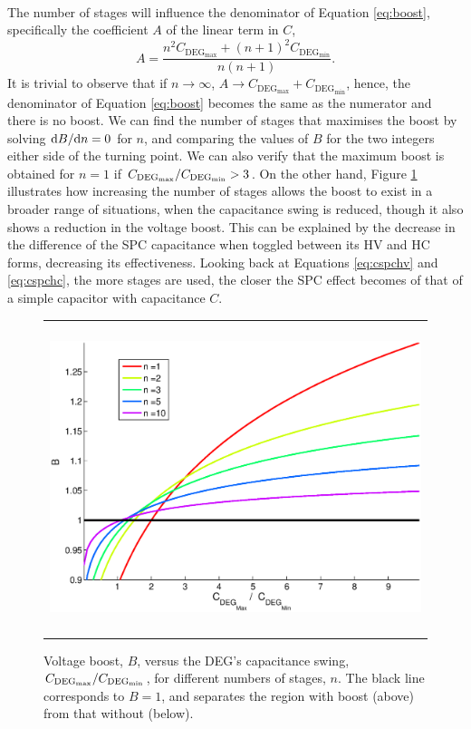 \paragraph{} The number of stages will influence the denominator of Equation \ref{eq:boost}, specifically the coefficient $A$ of the linear term in $C$,
\begin{equation}
A = \frac{n^{2}C_{\text{DEG}_{\max}}+(n+1)^{2}C_{\text{DEG}_{\min}}}{n(n+1)}.
\end{equation}
It is trivial to observe that if $n\rightarrow\infty$, $A\rightarrow C_{\text{DEG}_{\max}}+C_{\text{DEG}_{\min}}$, hence,  the denominator  of Equation \ref{eq:boost} becomes the same as the numerator and there is no boost.
We can find the number of stages that maximises the boost by solving ${\mathrm{d}B}/{\mathrm{d}n}=0$ for $n$, and comparing the values of $B$ for the two integers either side of the turning point.
We can also verify that the maximum boost is obtained for $n=1$ if ${C_{\text{DEG}_\text{max}}}/{C_{\text{DEG}_\text{min}}}>3$. On the other hand, Figure \ref{fig:nvariation} illustrates how increasing the number of stages allows the boost to exist in a broader range of situations, when the capacitance swing is reduced, though it also shows a reduction in the voltage boost. This can be explained by the decrease in the difference of the SPC capacitance when toggled between its HV and HC forms, decreasing its effectiveness. Looking back at Equations \ref{eq:cspchv} and \ref{eq:cspchc}, the more stages are used, the closer the SPC effect becomes of that of a simple capacitor with capacitance $C$.

\begin{figure}[ht]
\begin{center}
\begin{tabular}{c}
\includegraphics[height=9cm]{fig03/stages2.eps}\\
\end{tabular}
\end{center}
\caption 
{ \label{fig:nvariation}
Voltage boost, $B$, versus the DEG's capacitance swing, ${C_{\text{DEG}_\text{max}}}/{C_{\text{DEG}_\text{min}}}$, for different numbers of stages, $n$. The black line corresponds to $B=1$, and separates the region with boost (above) from that without (below).} 
\end{figure}

